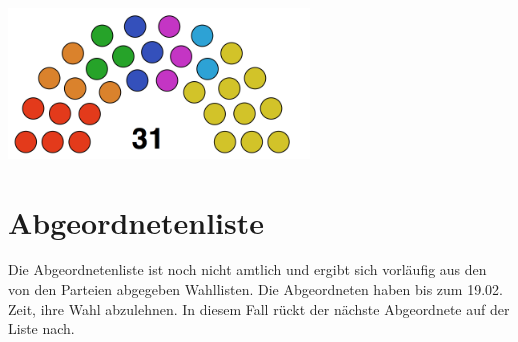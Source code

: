 \documentclass{sasbase}
\begin{document}
\begin{center}
		\includegraphics[width=8cm]{parliament.png}
	\end{center}
\newpage

\section{Abgeordnetenliste}

Die Abgeordnetenliste ist noch nicht amtlich und ergibt sich vorläufig aus den von den Parteien abgegeben Wahllisten. Die Abgeordneten haben bis zum 19.02. Zeit, ihre Wahl
abzulehnen. In diesem Fall rückt der nächste Abgeordnete auf der Liste nach. 
\end{document}
